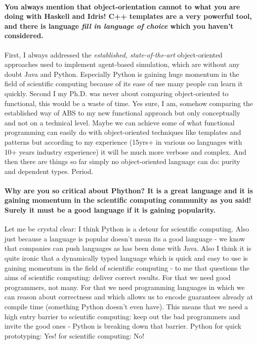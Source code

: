 \paragraph{You always mention that object-orientation cannot to what you are doing with Haskell and Idris! C++ templates are a very powerful tool, and there is language \textit{fill in language of choice} which you haven't considered.}
First, I always addressed the \textit{established, state-of-the-art} object-oriented approaches used to implement agent-based simulation, which are without any doubt Java and Python. Especially Python is gaining huge momentum in the field of scientific computing because of its ease of use many people can learn it quickly. Second I my Ph.D. was never about comparing object-oriented to functional, this would be a waste of time. Yes sure, I am, somehow comparing the established way of ABS to my new functional approach but only conceptually and not on a technical level. Maybe we can achieve some of what functional programming can easily do with object-oriented techniques like templates and patterns but according to my experience (15yrs+ in various oo languages with 10+ years industry experience) it will be much more verbose and complex. And then there are things so far simply no object-oriented language can do: purity and dependent types. Period.

\paragraph{Why are you so critical about Phython? It is a great language and it is gaining momentum in the scientific computing community as you said! Surely it must be a good language if it is gaining popularity.}
Let me be crystal clear: I think Python is a detour for scientific computing. Also just because a language is popular doesn't mean its a good language - we know that companies can push languages as has been done with Java. Also I think it is quite ironic that a dynamically typed language which is quick and easy to use is gaining momentum in the field of scientific computing - to me that questions the aims of scientific computing: deliver correct results. For that we need good programmers, not many. For that we need programming languages in which we can reason about correctness and which allows us to encode guarantees already at compile time (something Python doesn't even have). This means that we need a high entry barrier to scientific computing: keep out the bad programmers and invite the good ones - Python is breaking down that barrier. Python for quick prototyping: Yes! for scientific computing: No!